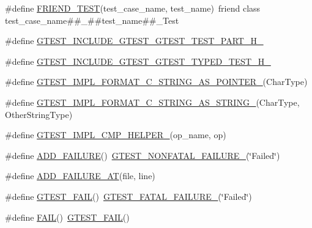 \begin{DoxyCompactItemize}
\#define \hyperlink{fused-src_2gtest_2gtest_8h_a8d443b4cc1d87a7a17943b8fbdbf3910}{F\-R\-I\-E\-N\-D\-\_\-\-T\-E\-S\-T}(test\-\_\-case\-\_\-name, test\-\_\-name)~friend class test\-\_\-case\-\_\-name\#\#\-\_\-\#\#test\-\_\-name\#\#\-\_\-\-Test
\item 
\#define \hyperlink{fused-src_2gtest_2gtest_8h_a6454a5e01489b59f55be53c206ca929b}{G\-T\-E\-S\-T\-\_\-\-I\-N\-C\-L\-U\-D\-E\-\_\-\-G\-T\-E\-S\-T\-\_\-\-G\-T\-E\-S\-T\-\_\-\-T\-E\-S\-T\-\_\-\-P\-A\-R\-T\-\_\-\-H\-\_\-}
\item 
\#define \hyperlink{fused-src_2gtest_2gtest_8h_adddef1e04ac44c9721ce3716c1b8a09e}{G\-T\-E\-S\-T\-\_\-\-I\-N\-C\-L\-U\-D\-E\-\_\-\-G\-T\-E\-S\-T\-\_\-\-G\-T\-E\-S\-T\-\_\-\-T\-Y\-P\-E\-D\-\_\-\-T\-E\-S\-T\-\_\-\-H\-\_\-}
\item 
\#define \hyperlink{fused-src_2gtest_2gtest_8h_a79d4724b4bc2a1dd8493c366b5ca626a}{G\-T\-E\-S\-T\-\_\-\-I\-M\-P\-L\-\_\-\-F\-O\-R\-M\-A\-T\-\_\-\-C\-\_\-\-S\-T\-R\-I\-N\-G\-\_\-\-A\-S\-\_\-\-P\-O\-I\-N\-T\-E\-R\-\_\-}(Char\-Type)
\item 
\#define \hyperlink{fused-src_2gtest_2gtest_8h_ad6102ed2a0571d5196e606a061c16a10}{G\-T\-E\-S\-T\-\_\-\-I\-M\-P\-L\-\_\-\-F\-O\-R\-M\-A\-T\-\_\-\-C\-\_\-\-S\-T\-R\-I\-N\-G\-\_\-\-A\-S\-\_\-\-S\-T\-R\-I\-N\-G\-\_\-}(Char\-Type, Other\-String\-Type)
\item 
\#define \hyperlink{fused-src_2gtest_2gtest_8h_a4a5b6fbde5dd05e05dd6846ac5e5c18e}{G\-T\-E\-S\-T\-\_\-\-I\-M\-P\-L\-\_\-\-C\-M\-P\-\_\-\-H\-E\-L\-P\-E\-R\-\_\-}(op\-\_\-name, op)
\item 
\#define \hyperlink{fused-src_2gtest_2gtest_8h_adc16b5b0a740c39084ea5c9e960e3063}{A\-D\-D\-\_\-\-F\-A\-I\-L\-U\-R\-E}()~\hyperlink{gtest-internal_8h_a6cb7482cfa03661a91c698eb5895f642}{G\-T\-E\-S\-T\-\_\-\-N\-O\-N\-F\-A\-T\-A\-L\-\_\-\-F\-A\-I\-L\-U\-R\-E\-\_\-}(\char`\"{}Failed\char`\"{})
\item 
\#define \hyperlink{fused-src_2gtest_2gtest_8h_a448d7e5105b640e892fd8153fbee0b7f}{A\-D\-D\-\_\-\-F\-A\-I\-L\-U\-R\-E\-\_\-\-A\-T}(file, line)
\item 
\#define \hyperlink{fused-src_2gtest_2gtest_8h_a636231436707c30d6778f79ae96f5dc6}{G\-T\-E\-S\-T\-\_\-\-F\-A\-I\-L}()~\hyperlink{gtest-internal_8h_a0f9a4c3ea82cc7bf4478eaffdc168358}{G\-T\-E\-S\-T\-\_\-\-F\-A\-T\-A\-L\-\_\-\-F\-A\-I\-L\-U\-R\-E\-\_\-}(\char`\"{}Failed\char`\"{})
\item 
\#define \hyperlink{fused-src_2gtest_2gtest_8h_a3e26a8d27caa386ed0ea7ce9d5b7c4ed}{F\-A\-I\-L}()~\hyperlink{include_2gtest_2gtest_8h_a636231436707c30d6778f79ae96f5dc6}{G\-T\-E\-S\-T\-\_\-\-F\-A\-I\-L}()

\end{DoxyCompactItemize}
